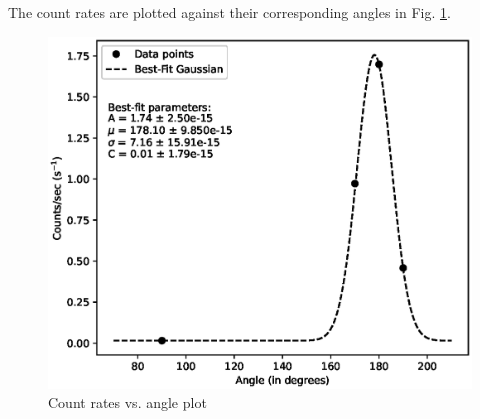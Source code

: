 The count rates are plotted against their corresponding angles in Fig. \ref{plt}.

\begin{figure}[H]
    \centering
    \includegraphics[width=1\columnwidth]{images/plt.eps}
    \caption{Count rates vs. angle plot}
    \label{plt}
\end{figure}